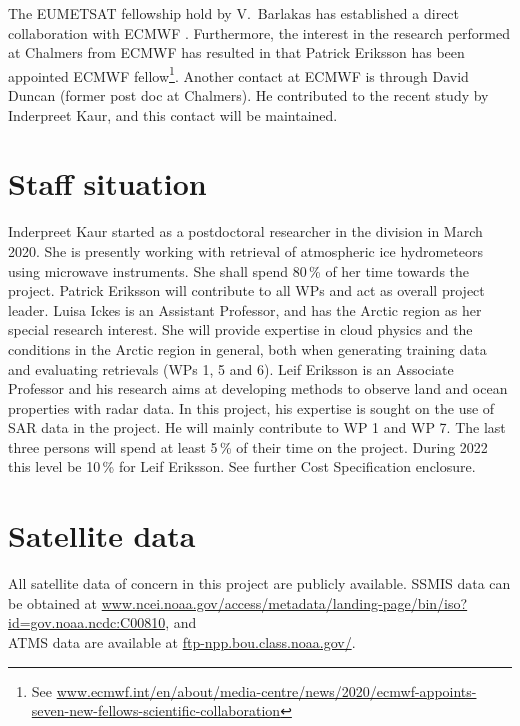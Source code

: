 \documentclass[12pt,oneside,a4paper]{article}
\begin{document}
The EUMETSAT fellowship hold by V.\ Barlakas has established a direct
collaboration with ECMWF \citep{barlakas:intro:21}. Furthermore, the interest
in the research performed at Chalmers from ECMWF has resulted in
that Patrick
Eriksson has been appointed ECMWF fellow\footnote{See 
  \url{www.ecmwf.int/en/about/media-centre/news/2020/ecmwf-appoints-seven-new-fellows-scientific-collaboration}}.
Another contact at ECMWF is through David Duncan (former post doc at Chalmers).
He contributed to the recent study by Inderpreet Kaur, and this contact will be
maintained.



\section{Staff situation}
%
\label{sec:staff}
Inderpreet Kaur started as a postdoctoral researcher in the division in March
2020. She is presently working with retrieval of atmospheric ice hydrometeors
using microwave instruments. She shall spend 80\,\% of her time towards the
project. Patrick Eriksson will contribute to all WPs and act as overall project
leader. Luisa Ickes is an Assistant Professor, and has the Arctic region as her
special research interest. She will provide expertise in cloud physics and the
conditions in the Arctic region in general, both when generating training data
and evaluating retrievals (WPs 1, 5 and 6). Leif Eriksson is an Associate
Professor and his research aims at developing methods to observe land and ocean
properties with radar data. In this project, his expertise is sought on the use
of SAR data in the project. He will mainly contribute to WP 1 and WP 7. The
last three persons will spend at least 5\,\% of their time on the project.
During 2022 this level be 10\,\% for Leif Eriksson. See further Cost
Specification enclosure.



\section{Satellite data}
%
All satellite data of concern in this project are publicly available. SSMIS
data can be obtained at
\url{www.ncei.noaa.gov/access/metadata/landing-page/bin/iso?id=gov.noaa.ncdc:C00810},
and\\ATMS data are available at \url{ftp-npp.bou.class.noaa.gov/}.

{\footnotesize
	
}
\end{document}
